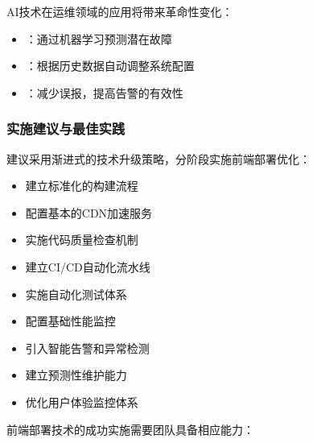 
AI技术在运维领域的应用将带来革命性变化：

\begin{itemize}
\tightlist
\item
  ：通过机器学习预测潜在故障
\item
  ：根据历史数据自动调整系统配置
\item
  ：减少误报，提高告警的有效性
\end{itemize}

\hypertarget{ux5b9eux65bdux5efaux8baeux4e0eux6700ux4f73ux5b9eux8df5}{%
\subsubsection{实施建议与最佳实践}\label{ux5b9eux65bdux5efaux8baeux4e0eux6700ux4f73ux5b9eux8df5}}


建议采用渐进式的技术升级策略，分阶段实施前端部署优化：


\begin{itemize}
\tightlist
\item
  建立标准化的构建流程
\item
  配置基本的CDN加速服务
\item
  实施代码质量检查机制
\end{itemize}


\begin{itemize}
\tightlist
\item
  建立CI/CD自动化流水线
\item
  实施自动化测试体系
\item
  配置基础性能监控
\end{itemize}


\begin{itemize}
\tightlist
\item
  引入智能告警和异常检测
\item
  建立预测性维护能力
\item
  优化用户体验监控体系
\end{itemize}


前端部署技术的成功实施需要团队具备相应能力：

